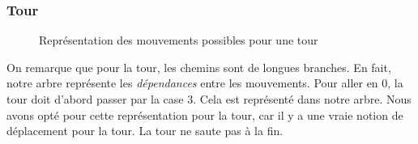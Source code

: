 \subsubsection{Tour}
\begin{figure}[H]
    \centering
    \hspace{1.5em}
    \caption{Représentation des mouvements possibles pour une tour}
\end{figure}
On remarque que pour la tour, les chemins sont de longues branches.
En fait, notre arbre représente les \emph{dépendances} entre les mouvements.
Pour aller en 0, la tour doit d'abord passer par la case 3. Cela est représenté dans notre
arbre. Nous avons opté pour cette représentation pour la tour, car il y a
une vraie notion de déplacement pour la tour. La tour ne saute pas à la fin.

